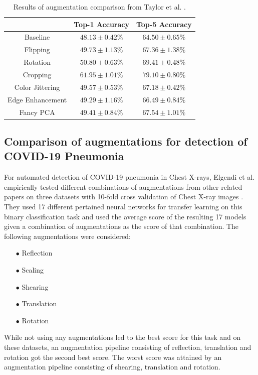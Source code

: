 \documentclass[10pt]{book}
\begin{document}
\begin{table}
  \begin{tabular}{ c c c }
    & Top-1 Accuracy & Top-5 Accuracy \\ 
   \hline
   Baseline & $48.13 \pm 0.42\%$ & $64.50 \pm 0.65\%$ \\
   Flipping & $49.73 \pm 1.13\%$ & $67.36 \pm 1.38\%$ \\
   Rotation & $50.80 \pm 0.63\%$ & $69.41 \pm 0.48\%$ \\
   Cropping & $61.95 \pm 1.01\%$ & $79.10 \pm 0.80\%$ \\
   Color Jittering & $49.57 \pm 0.53\%$ & $67.18 \pm 0.42\%$ \\
   Edge Enhancement & $49.29 \pm 1.16\%$ & $66.49 \pm 0.84\%$ \\
   Fancy PCA & $49.41 \pm 0.84\%$ & $67.54 \pm 1.01\%$ \\
   \hline
  \end{tabular}
  \caption{\label{tab:taylor-acc}Results of augmentation comparison from Taylor et al. \cite{8628742}.}
\end{table}

\subsection{Comparison of augmentations for detection of COVID-19 Pneumonia}

For automated detection of COVID-19 pneumonia in Chest X-rays, Elgendi et al. empirically tested different combinations of augmentations from other related papers on three datasets with 10-fold cross validation of Chest X-ray images \cite{elgendi2021effectiveness}. They used 17 different pertained neural networks for transfer learning on this binary classification task and used the average score of the resulting 17 models given a combination of augmentations as the score of that combination. The following augmentations were considered:

\begin{itemize}
  \item[$\bullet$] Reflection
  \item[$\bullet$] Scaling
  \item[$\bullet$] Shearing
  \item[$\bullet$] Translation
  \item[$\bullet$] Rotation
\end{itemize}

While not using any augmentations led to the best score for this task and on these datasets, an augmentation pipeline consisting of reflection, translation and rotation got the second best score. The worst score was attained by an augmentation pipeline consisting of shearing, translation and rotation. 
\end{document}
